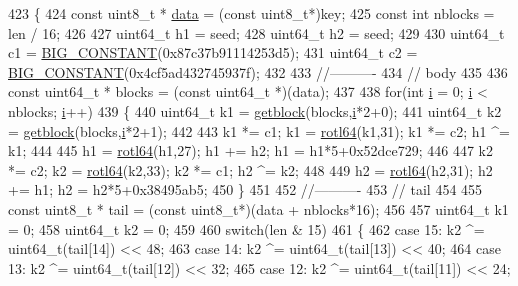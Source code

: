 \begin{DoxyCode}
423 \{
424   \textcolor{keyword}{const} uint8\_t * \hyperlink{topology-example-sim_8cc_a26c65296e316af77b787dc77469bb2a4}{data} = (\textcolor{keyword}{const} uint8\_t*)key;
425   \textcolor{keyword}{const} \textcolor{keywordtype}{int} nblocks = len / 16;
426 
427   uint64\_t h1 = seed;
428   uint64\_t h2 = seed;
429 
430   uint64\_t c1 = \hyperlink{group__hash__murmur3_ga8e0f90a6ea3d3db65033b8ace70cb65a}{BIG\_CONSTANT}(0x87c37b91114253d5);
431   uint64\_t c2 = \hyperlink{group__hash__murmur3_ga8e0f90a6ea3d3db65033b8ace70cb65a}{BIG\_CONSTANT}(0x4cf5ad432745937f);
432 
433   \textcolor{comment}{//----------}
434   \textcolor{comment}{// body}
435 
436   \textcolor{keyword}{const} uint64\_t * blocks = (\textcolor{keyword}{const} uint64\_t *)(data);
437 
438   \textcolor{keywordflow}{for}(\textcolor{keywordtype}{int} \hyperlink{bernuolliDistribution_8m_a6f6ccfcf58b31cb6412107d9d5281426}{i} = 0; \hyperlink{bernuolliDistribution_8m_a6f6ccfcf58b31cb6412107d9d5281426}{i} < nblocks; \hyperlink{bernuolliDistribution_8m_a6f6ccfcf58b31cb6412107d9d5281426}{i}++)
439   \{
440     uint64\_t k1 = \hyperlink{group__hash__murmur3_ga45409abb5582f7786cd88c3c8e19744c}{getblock}(blocks,\hyperlink{bernuolliDistribution_8m_a6f6ccfcf58b31cb6412107d9d5281426}{i}*2+0);
441     uint64\_t k2 = \hyperlink{group__hash__murmur3_ga45409abb5582f7786cd88c3c8e19744c}{getblock}(blocks,\hyperlink{bernuolliDistribution_8m_a6f6ccfcf58b31cb6412107d9d5281426}{i}*2+1);
442 
443     k1 *= c1; k1  = \hyperlink{group__hash__murmur3_ga5649fec849183845d5f53fd54c9bd509}{rotl64}(k1,31); k1 *= c2; h1 ^= k1;
444 
445     h1 = \hyperlink{group__hash__murmur3_ga5649fec849183845d5f53fd54c9bd509}{rotl64}(h1,27); h1 += h2; h1 = h1*5+0x52dce729;
446 
447     k2 *= c2; k2  = \hyperlink{group__hash__murmur3_ga5649fec849183845d5f53fd54c9bd509}{rotl64}(k2,33); k2 *= c1; h2 ^= k2;
448 
449     h2 = \hyperlink{group__hash__murmur3_ga5649fec849183845d5f53fd54c9bd509}{rotl64}(h2,31); h2 += h1; h2 = h2*5+0x38495ab5;
450   \}
451 
452   \textcolor{comment}{//----------}
453   \textcolor{comment}{// tail}
454 
455   \textcolor{keyword}{const} uint8\_t * tail = (\textcolor{keyword}{const} uint8\_t*)(data + nblocks*16);
456 
457   uint64\_t k1 = 0;
458   uint64\_t k2 = 0;
459 
460   \textcolor{keywordflow}{switch}(len & 15)
461   \{
462   \textcolor{keywordflow}{case} 15: k2 ^= uint64\_t(tail[14]) << 48;
463   \textcolor{keywordflow}{case} 14: k2 ^= uint64\_t(tail[13]) << 40;
464   \textcolor{keywordflow}{case} 13: k2 ^= uint64\_t(tail[12]) << 32;
465   \textcolor{keywordflow}{case} 12: k2 ^= uint64\_t(tail[11]) << 24;

\end{DoxyCode}

